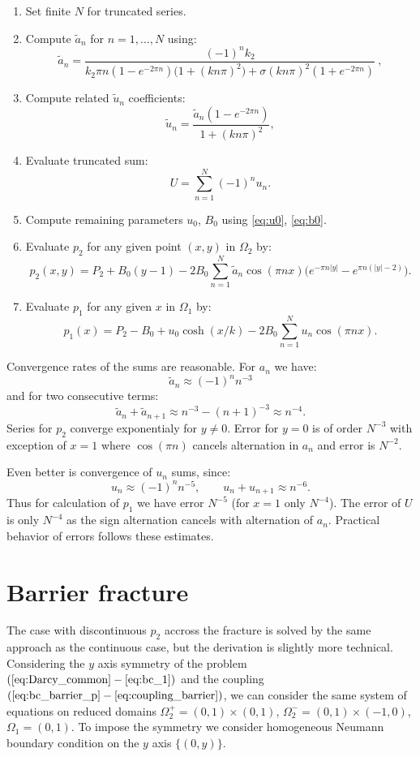 \documentclass[a4paper,10pt]{article}
\begin{document}
\begin{enumerate}
    \item Set finite $N$ for truncated series. 
    \item Compute $\tilde a_n$ for $n = 1, \dots, N$ using:
    \[
        \tilde a_n = \frac{(-1)^n k_2}{ k_2 \pi n (1 - e^{-2\pi n}) \big(1 + (k n \pi)^2\big) 
            + \sigma (k n \pi)^2 (1 + e^{-2\pi n})} \ , 
    \]
    \item Compute related $\tilde u_n$ coefficients:
    \[
        \tilde u_n = \frac{\tilde a_n (1 - e^{-2\pi n})}{1 + (k n \pi)^2}, 
    \]
    \item Evaluate truncated sum:
    \[
        U =  \sum_{n=1}^{N} (-1)^n u_n.
    \]
    \item Compute remaining parameters $u_0$, $B_0$ using \eqref{eq:u0}, \eqref{eq:b0}.
    \item Evaluate $p_2$ for any given point $(x,y)$ in $\Omega_2$ by:
    \[
        p_2(x,y) = P_2 + B_0(y-1) -2B_0 \sum_{n=1}^N \tilde a_n \cos(\pi n x) 
        \Big( e^{-\pi n |y|} - e^{\pi n (|y|-2)}\Big).
    \]
    \item Evaluate $p_1$ for any given $x$ in $\Omega_1$ by:
    \[
        p_1(x) = P_2 - B_0 + u_0 \cosh(x/k) - 2 B_0 \sum_{n=1}^N  u_n \cos(\pi n x). 
    \]    
\end{enumerate}

Convergence rates of the sums are reasonable. For $a_n$ we have:
\[
    \tilde a_n \approx (-1)^n n^{-3} 
\]
and for two consecutive terms:
\[
    \tilde a_n + \tilde a_{n+1} \approx n^{-3} - (n+1)^{-3} \approx  n^{-4}. 
\]
Series for $p_2$ converge exponentialy for $y\ne 0$. Error for $y=0$ is of order $N^{-3}$ with exception
of  $x=1$ where $\cos(\pi n)$ cancels alternation in $a_n$ and error is $N^{-2}$.

Even better is convergence of $u_n$ sums, since:
\[
    u_n \approx (-1)^n n^{-5},\qquad u_n+u_{n+1} \approx  n^{-6}.
\]
Thus for calculation of $p_1$ we have error  $N^{-5}$ (for $x=1$ only $N^{-4}$). The error of $U$ is only $N^{-4}$ 
as the sign alternation cancels with alternation of $a_n$.
Practical behavior of errors follows these estimates.



\section{Barrier fracture}
\label{sec:barrier_frac}
The case with discontinuous $p_2$ accross the fracture is solved by the same approach as the continuous case, 
but the derivation is slightly more technical. Considering the $y$ axis symmetry of the problem $(\ref{eq:Darcy_common} - \ref{eq:bc_1})$ and 
the coupling $(\ref{eq:bc_barrier_p} - \ref{eq:coupling_barrier})$, we can consider the same system of equations 
on reduced domains $\Omega_2^+ = (0,1)\times (0,1)$, $\Omega_2^- = (0,1)\times(-1,0)$,
$\Omega_1 = (0,1)$. To impose the symmetry we consider homogeneous Neumann boundary condition on the $y$ axis $\{(0,y)\}$.
\end{document}
